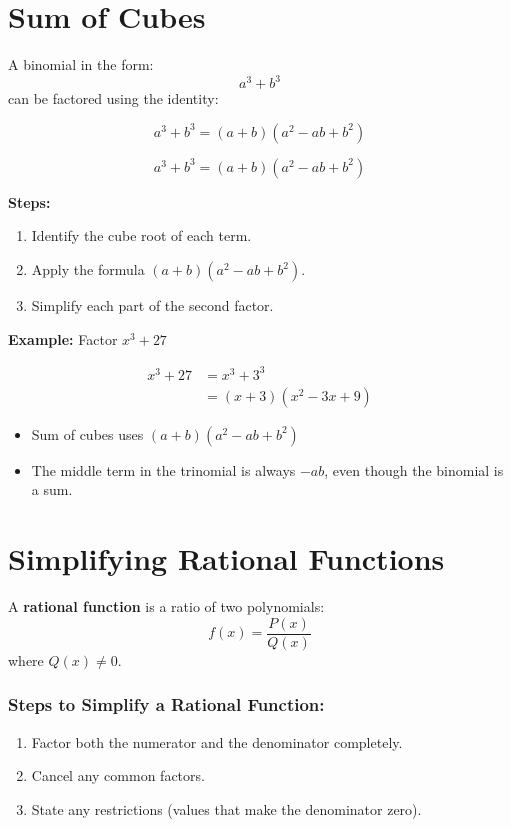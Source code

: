 \documentclass[11pt]{article}
\begin{document}
\section{Sum of Cubes}

A binomial in the form:
\[
a^3 + b^3
\]
can be factored using the identity:

\[
a^3 + b^3 = (a + b)(a^2 - ab + b^2)
\]

\begin{tcolorbox}[colback=blue!5!white, colframe=blue!80!black, title=Sum of Cubes Formula]
\[
a^3 + b^3 = (a + b)(a^2 - ab + b^2)
\]
\end{tcolorbox}

\textbf{Steps:}
\begin{enumerate}
  \item Identify the cube root of each term.
  \item Apply the formula \( (a + b)(a^2 - ab + b^2) \).
  \item Simplify each part of the second factor.
\end{enumerate}

\textbf{Example:}
Factor \( x^3 + 27 \)

\begin{align*}
x^3 + 27 &= x^3 + 3^3 \\
&= (x + 3)(x^2 - 3x + 9)
\end{align*}

\begin{tcolorbox}[colback=yellow!5!white, colframe=yellow!80!black, title=Remember:]
\begin{itemize}
  \item Sum of cubes uses \( (a + b)(a^2 - ab + b^2) \)
  \item The middle term in the trinomial is always \(-ab\), even though the binomial is a sum.
\end{itemize}
\end{tcolorbox}

\section{Simplifying Rational Functions}

A \textbf{rational function} is a ratio of two polynomials:
\[
f(x) = \frac{P(x)}{Q(x)}
\]
where \( Q(x) \neq 0 \).

\subsubsection*{Steps to Simplify a Rational Function:}
\begin{enumerate}
  \item Factor both the numerator and the denominator completely.
  \item Cancel any common factors.
  \item State any restrictions (values that make the denominator zero).
\end{enumerate}
\end{document}
